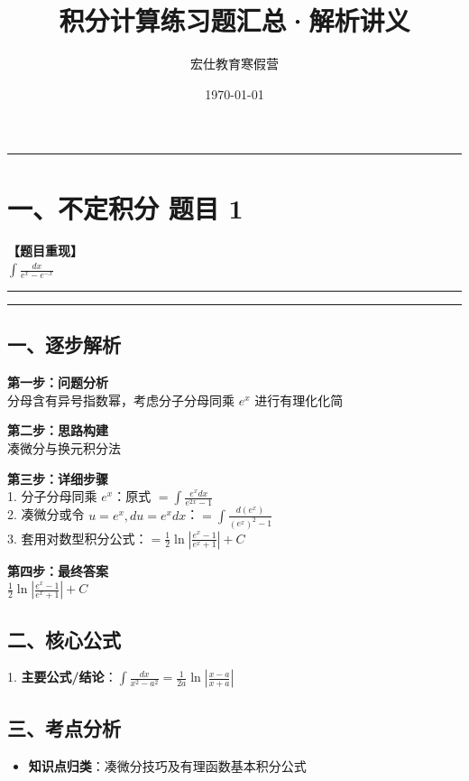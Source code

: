 ﻿\documentclass[12pt, a4paper]{ctexart}
\newcommand{\TopSeparator}{
    \par\noindent\rule{\textwidth}{1.5pt}\vspace{0.5em}
}
\newcommand{\AnalysisSeparator}{
    \par\noindent\rule{\textwidth}{0.5pt}\vspace{0.2em}\hrule\vspace{0.5em}
}
\newenvironment{RedAnalysis}{
    \par
    \color{red} 
}{
    \par
    \color{black} 
}
\begin{document}
\title{\textbf{积分计算练习题汇总·解析讲义}}
\author{宏仕教育寒假营}
\date{\today}
\maketitle

\TopSeparator
\section*{一、不定积分 题目 1}

\textbf{【题目重现】} \\
$\int \frac{dx}{e^x - e^{-x}}$

\AnalysisSeparator

\begin{RedAnalysis}

	\subsection*{一、逐步解析}

	\textbf{第一步：问题分析} \\
	分母含有异号指数幂，考虑分子分母同乘 $e^x$ 进行有理化化简

	\textbf{第二步：思路构建} \\
	凑微分与换元积分法

	\textbf{第三步：详细步骤} \\
	1. 分子分母同乘 $e^x$：原式 $ = \int \frac{e^x dx}{e^{2x}-1}$ \\ 
	2. 凑微分或令 $u=e^x, du=e^xdx$：$ = \int \frac{d(e^x)}{(e^x)^2-1}$ \\ 
	3. 套用对数型积分公式：$ = \frac{1}{2} \ln \left| \frac{e^x-1}{e^x+1} \right| + C$

	\textbf{第四步：最终答案} \\
	$\frac{1}{2} \ln \left| \frac{e^x-1}{e^x+1} \right| + C$

	\subsection*{二、核心公式}
	1. \textbf{主要公式/结论}：$\int \frac{dx}{x^2-a^2} = \frac{1}{2a} \ln \left| \frac{x-a}{x+a} \right|$

	\subsection*{三、考点分析}
	\begin{itemize}
		\item \textbf{知识点归类}：凑微分技巧及有理函数基本积分公式
	\end{itemize}

\end{RedAnalysis}
\end{document}
